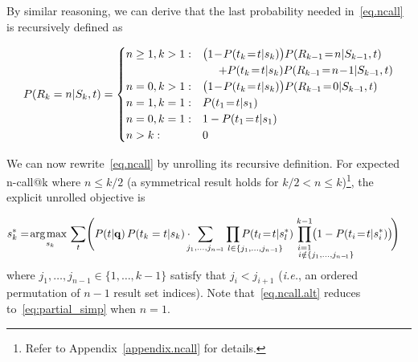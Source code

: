 By similar reasoning, we can derive that the last probability 
needed in~\eqref{eq.ncall} is recursively defined as 

\begin{align*}
P(R_k=n|S_k,t)=
\begin{cases}
n \geq 1, k > 1:  &  \bigl( 1\!-\!P(t_k\!=\!t|s_k) \bigr) P(R_{k-1}\!=\!n|S_{k-1},t) \nonumber \\
  & \hspace{5mm} + P(t_k\!=\!t|s_k) P(R_{k-\!1}\!=\!n\!-\!1|S_{k-\!1},t) \\
n = 0, k > 1:   & \bigl( 1\!-\!P(t_k\!=\!t|s_k) \bigr) P(R_{k-\!1}\!=\!0|S_{k-\!1},t) \\
n = 1, k = 1:   & P(t_1\!=\!t|s_1) \\
n = 0, k = 1:   & 1 - P(t_1\!=\!t|s_1) \\
n > k:			& 0
\end{cases}
\end{align*}

We can now rewrite~\eqref{eq.ncall} by unrolling its recursive definition.
For expected n-call@k where $n \leq k/2$ %
(a symmetrical result holds for $k/2 < n \leq k$)\footnote{Refer to Appendix~\ref{appendix.ncall} for details.}, the explicit unrolled objective is 

\begin{align}
  & s_k^* = \argmax_{s_k} \sum_t \Biggl( P(t|\vec{q}) \, P(t_k=t|s_k) \cdot \hspace{-2mm} \sum_{j_1, \dots, j_{n-\!1}} \hspace{-14mm} \prod_{\hspace{14.5mm} l \in \{j_1, \dots, j_{n-\!1}\}} \hspace{-14mm} P(t_l\!=\!t|s_l^*) \hspace{-13mm} \prod_{\substack{i=1 \\ \hspace{14mm} i \notin \{j_1, \dots, j_{n-\!1}\}}}^{k-1} \hspace{-13mm} \!\bigl( 1 - P(t_i\!=\!t|s_i^*) \bigr) \!\Biggr) \label{eq.ncall.alt}
\end{align}
where $j_1, \dots, j_{n-1} \in \{1,\ldots,k-1\}$ satisfy 
that $j_i < j_{i+1}$ (\emph{i.e.},
an ordered permutation of $n-1$ result set indices).
Note that~\eqref{eq.ncall.alt} reduces to~\eqref{eq:partial_simp} when $n=1$.

